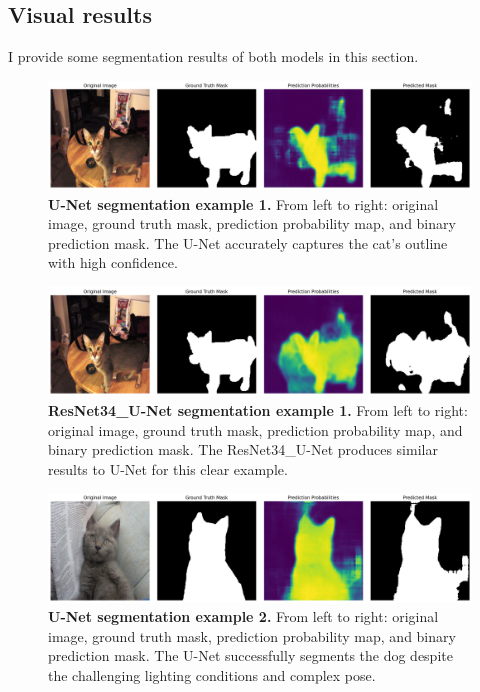 \documentclass[twocolumn,a4paper]{article}
\begin{document}
\subsection{Visual results}
I provide some segmentation results of both models in this section.
\begin{figure}[H]
\centering
\includegraphics[width=0.95\linewidth]{figs/unet_sample_0_0}
\caption{\textbf{U-Net segmentation example 1.} From left to right: original image, ground truth mask, prediction probability map, and binary prediction mask. The U-Net accurately captures the cat's outline with high confidence.}
\label{fig:unetsample00}
\end{figure}
\begin{figure}[H]
\centering
\includegraphics[width=0.95\linewidth]{figs/resnet_sample_0_0}
\caption{\textbf{ResNet34\_U-Net segmentation example 1.} From left to right: original image, ground truth mask, prediction probability map, and binary prediction mask. The ResNet34\_U-Net produces similar results to U-Net for this clear example.}
\label{fig:resnetsample00}
\end{figure}
\begin{figure}[H]
\centering
\includegraphics[width=0.95\linewidth]{figs/unet_sample_60_2}
\caption{\textbf{U-Net segmentation example 2.} From left to right: original image, ground truth mask, prediction probability map, and binary prediction mask. The U-Net successfully segments the dog despite the challenging lighting conditions and complex pose.}
\label{fig:unetsample602}
\end{figure}
\end{document}
